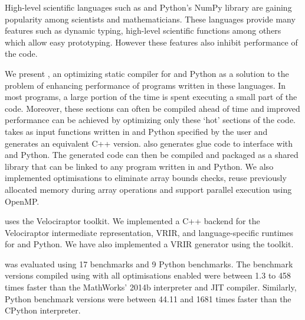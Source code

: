High-level scientific languages such as \matlab and Python's NumPy 
library are gaining popularity among scientists and 
mathematicians. These languages provide many features such as dynamic typing, 
high-level scientific functions among others which allow easy 
prototyping. However these features also inhibit performance of the code. 

We present \velocty, an optimizing static compiler for \matlab and Python as a 
solution to the problem of enhancing performance of programs written in these 
languages. In most programs, a large portion of the time is spent executing a 
small part of the code. Moreover, these sections can often be compiled ahead of 
time and improved performance can be achieved by optimizing only these `hot' 
sections of the code. \velocty takes as input functions written in \matlab and 
Python specified by the user and generates an equivalent C++ version. \velocty also generates glue code to interface with \matlab and Python. The generated code can then be compiled and packaged as 
a shared library that can be linked to any program written in \matlab and 
Python. We also implemented optimisations to eliminate array bounds checks, 
reuse previously allocated memory during array operations and support parallel execution using OpenMP. 

\velocty uses the Velociraptor toolkit. We implemented a C++ backend for the 
Velociraptor intermediate representation, VRIR, and language-specific runtimes 
for \matlab and Python. We have also implemented a \matlab VRIR generator using the \mclab toolkit. 

\velocty was evaluated using 17 \matlab benchmarks and 9 Python benchmarks. The \matlab benchmark versions 
compiled using \velocty with all optimisations enabled were between 1.3 to 458 times faster than the MathWorks' 
\matlab2014b interpreter and JIT compiler. Similarly, Python benchmark versions were between 44.11 and 1681 times faster than the CPython interpreter.
